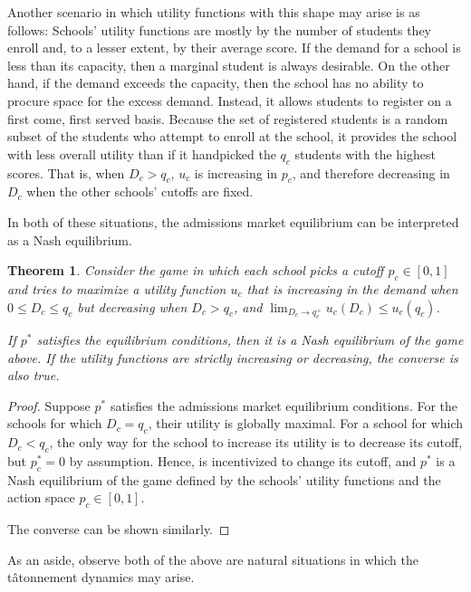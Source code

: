\documentclass[12pt]{article}
\newtheorem{theorem}{Theorem}
\theoremstyle{definition}
\begin{document}
Another scenario in which utility functions with this shape may arise is as follows: Schools' utility functions are mostly by the number of students they enroll and, to a lesser extent, by their average score. If the demand for a school is less than its capacity, then a marginal student is always desirable. On the other hand, if the demand exceeds the capacity, then the school has no ability to procure space for the excess demand. Instead, it allows students to register on a first come, first served basis. Because the set of registered students is a random subset of the students who attempt to enroll at the school, it provides the school with less overall utility than if it handpicked the $q_c$ students with the highest scores. That is, when $D_c > q_c$, $u_c$ is increasing in $p_c$, and therefore decreasing in $D_c$ when the other schools' cutoffs are fixed. 

In both of these situations, the admissions market equilibrium can be interpreted as a Nash equilibrium. 
\begin{theorem}
Consider the game in which each school picks a cutoff $p_c \in [0,1]$ and tries to maximize a utility function $u_c$ that is increasing in the demand when $0 \leq D_c \leq q_c$ but decreasing when $D_c > q_c$, and $\lim_{D_c \to q_c^+} u_c(D_c) \leq u_c(q_c)$.

If $p^*$ satisfies the equilibrium conditions, then it is a Nash equilibrium of the game above. If the utility functions are strictly increasing or decreasing, the converse is also true.
\end{theorem}
\begin{proof} Suppose $p^*$ satisfies the admissions market equilibrium conditions. For the schools for which $D_c = q_c$, their utility is globally maximal. For a school for which $D_c < q_c$, the only way for the school to increase its utility is to decrease its cutoff, but $p_c^* = 0$ by assumption. Hence, is incentivized to change its cutoff, and $p^*$ is a Nash equilibrium of the game defined by the schools' utility functions and the action space $p_c \in [0, 1]$.

The converse can be shown similarly.\end{proof}

As an aside, observe both of the above are natural situations in which the t\^{atonnement} dynamics may arise.
\end{document}
